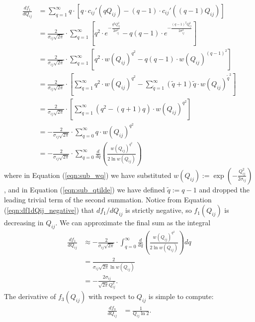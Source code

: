 \documentclass{article}
\begin{document}
\begin{align} 
\frac{d f_1}{d Q_{ij}} & = \sum_{q = 1}^\infty q \cdot \left[ q \cdot c_{ij}'(q Q_{ij}) - (q-1) \cdot c_{ij}'((q-1) Q_{ij}) \right] \\ 
& = \frac{2}{\sigma_{ij} \sqrt{2 \pi}} \cdot \sum_{q = 1}^\infty \left[ q^2 \cdot e^{- \frac{q^2 Q_{ij}^2}{2 \sigma_{ij}^2}} - q(q-1) \cdot e^{- \frac{(q-1)^2 Q_{ij}^2}{2 \sigma_{ij}^2}} \right] \\ 
& = \frac{2}{\sigma_{ij} \sqrt{2 \pi}} \cdot \sum_{{q} = 1}^\infty \left[ {q}^2 \cdot w(Q_{ij})^{{q}^2} - q (q-1) \cdot w(Q_{ij})^{(q-1)^2} \right] \label{eqn:sub_wq} \\ 
& =  \frac{2}{\sigma_{ij} \sqrt{2 \pi}} \cdot  \left[ \sum_{q = 1}^\infty {q}^2 \cdot w(Q_{ij})^{{q}^2} - \sum_{\tilde{q} = 1}^\infty (\tilde{q} + 1) \tilde{q} \cdot w(Q_{ij})^{\tilde{q}^2} \right] \label{eqn:sub_qtilde} \\ 
& = \frac{2}{\sigma_{ij} \sqrt{2 \pi}} \cdot  \left[ \sum_{q = 1}^\infty ({q}^2 - (q + 1)q) \cdot w(Q_{ij})^{{q}^2}  \right] \\ 
& = - \frac{2}{\sigma_{ij} \sqrt{2 \pi}} \cdot \sum_{q = 0}^\infty q \cdot w(Q_{ij})^{{q}^2} \label{eqn:df1dQij_negative} \\ 
& = - \frac{2}{\sigma_{ij} \sqrt{2 \pi}} \cdot \sum_{q = 0}^\infty \frac{d}{dq} \left( \frac{w(Q_{ij})^{{q}^2}}{2 \ln w(Q_{ij})} \right)
\end{align} 
where in Equation (\ref{eqn:sub_wq}) we have substituted $w(Q_{ij}) := \exp \left( -\frac{Q_{ij}^2}{2 \sigma_{ij}} \right)$, and in Equation (\ref{eqn:sub_qtilde}) we have defined $\tilde{q} := q - 1$ and dropped the leading trivial term of the second summation. Notice from Equation (\ref{eqn:df1dQij_negative}) that $d f_1 / d Q_{ij}$ is strictly negative, so $f_1(Q_{ij})$ is decreasing in $Q_{ij}$. We can approximate the final sum as the integral 
\begin{align} 
\frac{d f_1}{d Q_{ij}} & \approx - \frac{2}{\sigma_{ij} \sqrt{2 \pi}} \cdot \int_{q = 0}^\infty \frac{d}{dq} \left( \frac{w(Q_{ij})^{{q}^2}}{2 \ln w(Q_{ij})} \right) dq \\ 
& = \frac{2}{\sigma_{ij} \sqrt{2 \pi} \ln w(Q_{ij})} \\ 
& = - \frac{2 \sigma_{ij}}{\sqrt{2 \pi} Q_{ij}^2}. 
\end{align} 
The derivative of $f_3(Q_{ij})$ with respect to $Q_{ij}$ is simple to compute: 
\begin{align} 
\frac{df_3}{dQ_{ij}} & = \frac{1}{Q_{ij} \ln 2}. 
\end{align} 
\end{document}
